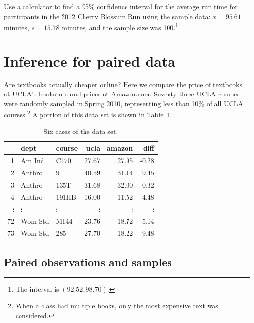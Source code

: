 \begin{exercise}
Use a calculator to find a 95\% confidence interval for the average run time for participants in the 2012 Cherry Blossum Run using the sample data: $\bar{x} = 95.61$ minutes, $s = 15.78$ minutes, and the sample size was 100.\footnote{The interval is $(92.52, 98.70)$.}
\end{exercise}



\textA{\newpage}

\section{Inference for paired data}
\label{pairedData}



Are textbooks actually cheaper online? Here we compare the price of textbooks at UCLA's bookstore and prices at Amazon.com. Seventy-three UCLA courses were randomly sampled in Spring 2010, representing less than 10\% of all UCLA courses.\footnote{When a class had multiple books, only the most expensive text was considered.} A portion of this data set is shown in Table~\ref{textbooksDF}.

\begin{table}[h]
\centering
\begin{tabular}{rllrrr}
  \hline
 & dept & course & ucla & amazon & diff \\
  \hline
1 & Am Ind &  C170 & 27.67 & 27.95 & -0.28 \\
  2 & Anthro & 9 & 40.59 & 31.14 & 9.45 \\
  3 & Anthro & 135T & 31.68 & 32.00 & -0.32 \\
  4 & Anthro & 191HB & 16.00 & 11.52 & 4.48 \\
$\vdots$ & $\vdots$ & $\vdots$ & $\vdots$ & $\vdots$ & $\vdots$ \\
  72 & Wom Std & M144 & 23.76 & 18.72 & 5.04 \\
  73 & Wom Std & 285 & 27.70 & 18.22 & 9.48 \\
   \hline
\end{tabular}
\caption{Six cases of the  data set.}
\label{textbooksDF}
\end{table}

\subsection{Paired observations and samples}

